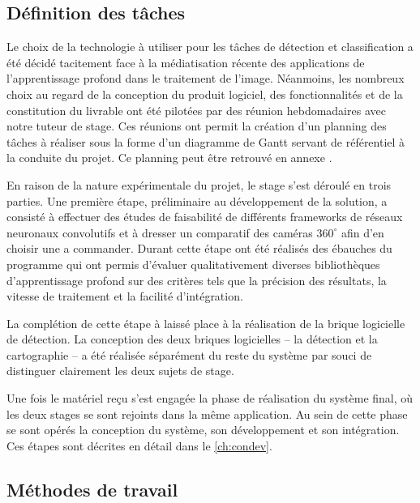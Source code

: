 		\subsection{Définition des tâches}
			
			Le choix de la technologie à utiliser pour les tâches de détection et classification a été décidé tacitement face à la médiatisation récente des applications de l'apprentissage profond dans le traitement de l'image. Néanmoins, les nombreux choix au regard de la conception du produit logiciel, des fonctionnalités et de la constitution du livrable ont été pilotées par des réunion hebdomadaires avec notre tuteur de stage. Ces réunions ont permit la création d'un planning des tâches à réaliser sous la forme d'un diagramme de Gantt servant de référentiel à la conduite du projet. Ce planning peut être retrouvé en annexe \todoref.
			\par
			En raison de la nature expérimentale du projet, le stage s'est déroulé en trois parties. Une première étape, préliminaire au développement de la solution, a consisté à effectuer des études de faisabilité de différents frameworks de réseaux neuronaux convolutifs et à dresser un comparatif des caméras $ 360^{\circ} $ afin d'en choisir une a commander. Durant cette étape ont été réalisés des ébauches du programme qui ont permis d'évaluer qualitativement diverses bibliothèques d'apprentissage profond sur des critères tels que la précision des résultats, la vitesse de traitement et la facilité d'intégration.
			\par
			La complétion de cette étape à laissé place à la réalisation de la brique logicielle de détection. La conception des deux briques logicielles -- la détection et la cartographie -- a été réalisée séparément du reste du système par souci de distinguer clairement les deux sujets de stage.
			\par
			Une fois le matériel reçu s'est engagée la phase de réalisation du système final, où les deux stages se sont rejoints dans la même application. Au sein de cette phase se sont opérés la conception du système, son développement et son intégration. Ces étapes sont décrites en détail dans le \autoref{ch:condev}.
			
			
		\subsection{Méthodes de travail}

